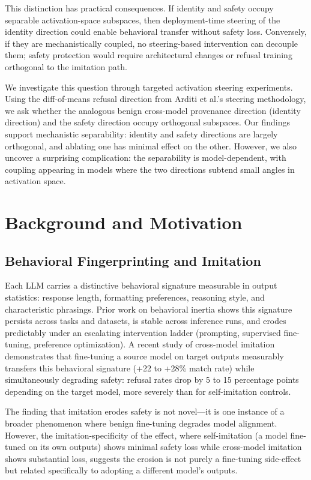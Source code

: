\documentclass[letterpaper,twocolumn]{article}
\begin{document}
This distinction has practical consequences. If identity and safety occupy separable activation-space subspaces, then deployment-time steering of the identity direction could enable behavioral transfer without safety loss. Conversely, if they are mechanistically coupled, no steering-based intervention can decouple them; safety protection would require architectural changes or refusal training orthogonal to the imitation path.

We investigate this question through targeted activation steering experiments. Using the diff-of-means refusal direction from Arditi et al.'s steering methodology, we ask whether the analogous benign cross-model provenance direction (identity direction) and the safety direction occupy orthogonal subspaces. Our findings support mechanistic separability: identity and safety directions are largely orthogonal, and ablating one has minimal effect on the other. However, we also uncover a surprising complication: the separability is model-dependent, with coupling appearing in models where the two directions subtend small angles in activation space.

\section{Background and Motivation}

\subsection{Behavioral Fingerprinting and Imitation}

Each LLM carries a distinctive behavioral signature measurable in output statistics: response length, formatting preferences, reasoning style, and characteristic phrasings. Prior work on behavioral inertia shows this signature persists across tasks and datasets, is stable across inference runs, and erodes predictably under an escalating intervention ladder (prompting, supervised fine-tuning, preference optimization). A recent study of cross-model imitation demonstrates that fine-tuning a source model on target outputs measurably transfers this behavioral signature (+22 to +28\% match rate) while simultaneously degrading safety: refusal rates drop by 5 to 15 percentage points depending on the target model, more severely than for self-imitation controls.

The finding that imitation erodes safety is not novel—it is one instance of a broader phenomenon where benign fine-tuning degrades model alignment. However, the imitation-specificity of the effect, where self-imitation (a model fine-tuned on its own outputs) shows minimal safety loss while cross-model imitation shows substantial loss, suggests the erosion is not purely a fine-tuning side-effect but related specifically to adopting a different model's outputs.
\end{document}
